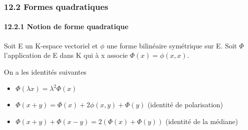 %
\subsubsection{12.2 Formes quadratiques}
%
\paragraph{12.2.1 Notion de forme quadratique}
%
Soit E un K-espace vectoriel et $\phi$ une forme bilinéaire symétrique sur E.
Soit $\Phi$ l'application de E dans K qui à x associe $\Phi(x) = \phi(x,x)$.
%
\begin{prop}

	On a les identités suivantes

	\begin{itemize}
		\item $\Phi(\lambda x) = \lambda^2\Phi(x)$
		\item
			$ \Phi(x + y) = \Phi(x) + 2\phi(x,y) + \Phi(y)$ (identité de polarisation)
		\item $\Phi(x + y) + \Phi(x - y) = 2(\Phi(x) + \Phi(y))$ (identité de la médiane)
	\end{itemize}
	\end{prop}
